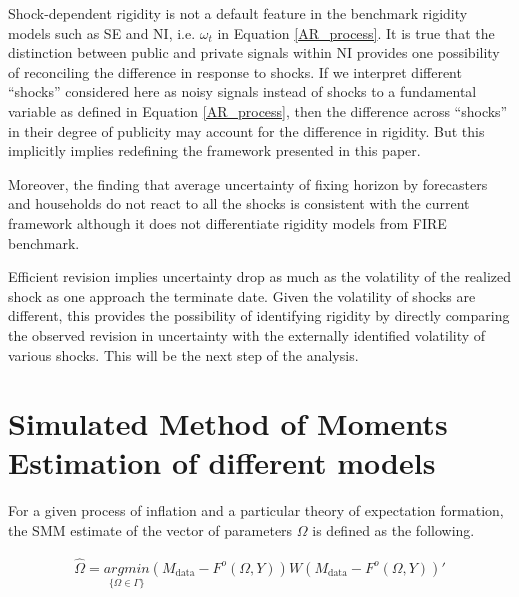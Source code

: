 \documentclass[12pt]{article}
\begin{document}
	Shock-dependent rigidity is not a default feature in the benchmark rigidity models such as SE and NI, i.e. $\omega_t$ in Equation \ref{AR_process}. It is true that the distinction between public and private signals within NI provides one possibility of reconciling the difference in response to shocks.  If we interpret different ``shocks'' considered here as noisy signals instead of shocks to a fundamental variable as defined in Equation \ref{AR_process}, then the difference across ``shocks'' in their degree of publicity may account for the difference in rigidity.  But this implicitly implies redefining the framework presented in this paper. 
	
	Moreover, the finding that average uncertainty of fixing horizon by forecasters and households do not react to all the shocks is consistent with the current framework although it does not differentiate rigidity models from FIRE benchmark.  
	
	Efficient revision implies uncertainty drop as much as the volatility of the realized shock as one approach the terminate date. Given the volatility of shocks are different, this provides the possibility of identifying rigidity by directly comparing the observed revision in uncertainty with the externally identified volatility of various shocks. This will be the next step of the analysis.  
	
	
	\section{Simulated Method of Moments Estimation of different models} 
	
	For a given process of inflation and a particular theory of expectation formation, the SMM estimate of the vector of parameters $\Omega$ is defined as the following. 
	
	\begin{eqnarray*}
		\widehat \Omega = \underset{\{\Omega \in \Gamma\} }{argmin} (M_{\textrm{data} } - F^{o}(\Omega, Y)) W  (M_{\textrm{data} } - F^{o}(\Omega, Y))'
	\end{eqnarray*}
	
\end{document}
